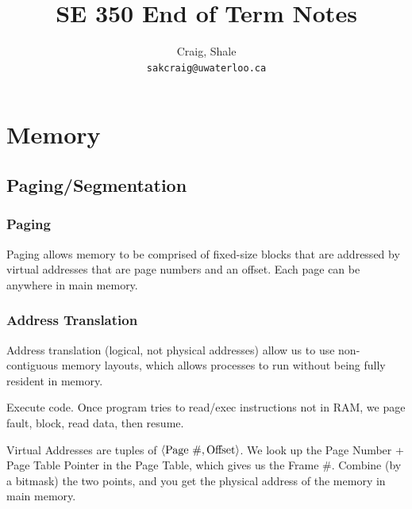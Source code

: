 \ifdefined\isphone
  
\else
  
\fi




\title{SE 350 End of Term Notes}

\author{
    Craig, Shale\\
    \texttt{sakcraig@uwaterloo.ca}
}
\maketitle

\tableofcontents

\chapter{Memory}
\label{cha:memory}

    \section{Paging/Segmentation} %
    \label{sec:paging_segmentation}
        \subsection{Paging} %
        \label{subsec:paging}
            Paging allows memory to be comprised of fixed-size blocks that are
            addressed by virtual addresses that are page numbers and an offset. Each
            page can be anywhere in main memory.

            \subsection{Address Translation} %
            \label{subsec:address_translation}
            Address translation (logical, not physical addresses) allow us to use
            non-contiguous memory layouts, which allows processes to run without
            being fully resident in memory.

            Execute code. Once program tries to read/exec instructions not in RAM,
            we page fault, block, read data, then resume.

            Virtual Addresses are tuples of $\left \langle \text{Page \#}, \text{Offset} \right \rangle $.
            We look up the Page Number + Page Table Pointer in the Page Table, which
            gives us the Frame \#. Combine (by a bitmask) the two points, and
            you get the physical address of the memory in main memory.

